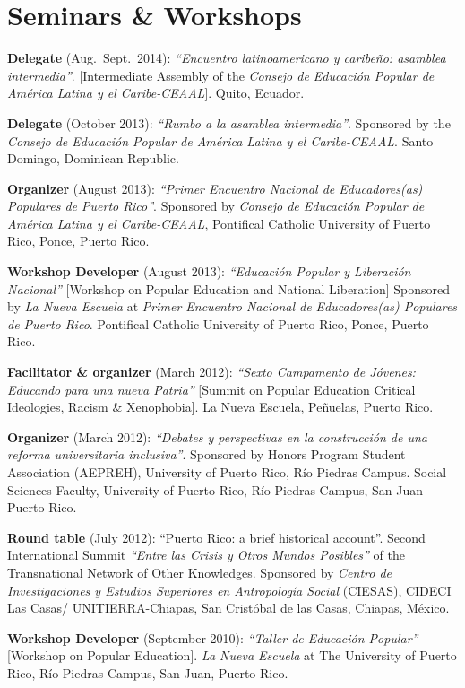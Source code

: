 \documentclass[11pt,a4paper,]{awesome-cv}
\begin{document}
\section{\texorpdfstring{ Seminars \&
Workshops}{ Seminars \& Workshops}}\label{seminars-workshops}

\textbf{Delegate} (Aug.~Sept.~2014): \emph{``Encuentro latinoamericano y
caribeño: asamblea intermedia''}. {[}Intermediate Assembly of the
\emph{Consejo de Educación Popular de América Latina y el
Caribe-CEAAL}{]}. Quito, Ecuador.

\textbf{Delegate} (October 2013): \emph{``Rumbo a la asamblea
intermedia''}. Sponsored by the \emph{Consejo de Educación Popular de
América Latina y el Caribe-CEAAL}. Santo Domingo, Dominican Republic.

\textbf{Organizer} (August 2013): \emph{``Primer Encuentro Nacional de
Educadores(as) Populares de Puerto Rico''}. Sponsored by \emph{Consejo
de Educación Popular de América Latina y el Caribe-CEAAL}, Pontifical
Catholic University of Puerto Rico, Ponce, Puerto Rico.

\textbf{Workshop Developer} (August 2013): \emph{``Educación Popular y
Liberación Nacional''} {[}Workshop on Popular Education and National
Liberation{]} Sponsored by \emph{La Nueva Escuela} at \emph{Primer
Encuentro Nacional de Educadores(as) Populares de Puerto Rico}.
Pontifical Catholic University of Puerto Rico, Ponce, Puerto Rico.

\textbf{Facilitator \& organizer} (March 2012): \emph{``Sexto Campamento
de Jóvenes: Educando para una nueva Patria''} {[}Summit on Popular
Education Critical Ideologies, Racism \& Xenophobia{]}. La Nueva
Escuela, Peñuelas, Puerto Rico.

\textbf{Organizer} (March 2012): \emph{``Debates y perspectivas en la
construcción de una reforma universitaria inclusiva''}. Sponsored by
Honors Program Student Association (AEPREH), University of Puerto Rico,
Río Piedras Campus. Social Sciences Faculty, University of Puerto Rico,
Río Piedras Campus, San Juan Puerto Rico.

\textbf{Round table} (July 2012): ``Puerto Rico: a brief historical
account''. Second International Summit \emph{``Entre las Crisis y Otros
Mundos Posibles''} of the Transnational Network of Other Knowledges.
Sponsored by \emph{Centro de Investigaciones y Estudios Superiores en
Antropología Social} (CIESAS), CIDECI Las Casas/ UNITIERRA-Chiapas, San
Cristóbal de las Casas, Chiapas, México.

\textbf{Workshop Developer} (September 2010): \emph{``Taller de
Educación Popular''} {[}Workshop on Popular Education{]}. \emph{La Nueva
Escuela} at The University of Puerto Rico, Río Piedras Campus, San Juan,
Puerto Rico.
\end{document}

